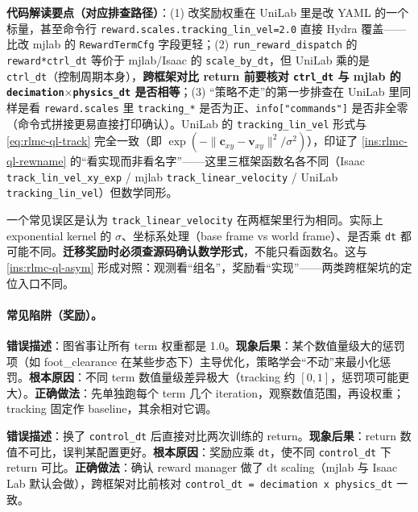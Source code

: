 \textbf{代码解读要点（对应排查路径）}：(1) 改奖励权重在 UniLab 里是改 YAML 的一个标量，甚至命令行 \verb|reward.scales.tracking_lin_vel=2.0| 直接 Hydra 覆盖——比改 mjlab 的 \verb|RewardTermCfg| 字段更轻；(2) \verb|run_reward_dispatch| 的 \verb|reward*ctrl_dt| 等价于 mjlab/Isaac 的 \verb|scale_by_dt|，但 UniLab 乘的是 \verb|ctrl_dt|（控制周期本身），\textbf{跨框架对比 return 前要核对 \texttt{ctrl\_dt} 与 mjlab 的 \texttt{decimation}$\times$\texttt{physics\_dt} 是否相等}；(3) “策略不走”的第一步排查在 UniLab 里同样是看 \verb|reward.scales| 里 \verb|tracking_*| 是否为正、\verb|info["commands"]| 是否非全零（命令式拼接更易直接打印确认）。UniLab 的 \verb|tracking_lin_vel| 形式与 \eqref{eq:rlmc-ql-track} 完全一致（即 $\exp(-\lVert\mathbf{c}_{xy}-\mathbf{v}_{xy}\rVert^2/\sigma^2)$），印证了 \cref{ins:rlmc-ql-rewname} 的“看实现而非看名字”——这里三框架函数名各不同（Isaac \verb|track_lin_vel_xy_exp| / mjlab \verb|track_linear_velocity| / UniLab \verb|tracking_lin_vel|）但数学同形。

\begin{insight}\label{ins:rlmc-ql-rewname}
一个常见误区是认为 \verb|track_linear_velocity| 在两框架里行为相同。实际上 exponential kernel 的 $\sigma$、坐标系处理（base frame vs world frame）、是否乘 \verb|dt| 都可能不同。\textbf{迁移奖励时必须查源码确认数学形式}，不能只看函数名。这与 \cref{ins:rlmc-ql-asym} 形成对照：观测看“组名”，奖励看“实现”——两类跨框架坑的定位入口不同。
\end{insight}

\paragraph{常见陷阱（奖励）。}

\begin{pitfall}[把所有奖励权重设为 1.0]
\textbf{错误描述}：图省事让所有 term 权重都是 1.0。\textbf{现象后果}：某个数值量级大的惩罚项（如 foot\_clearance 在某些步态下）主导优化，策略学会“不动”来最小化惩罚。\textbf{根本原因}：不同 term 数值量级差异极大（tracking 约 $[0,1]$，惩罚项可能更大）。\textbf{正确做法}：先单独跑每个 term 几个 iteration，观察数值范围，再设权重；tracking 固定作 baseline，其余相对它调。
\end{pitfall}

\begin{pitfall}
\textbf{错误描述}：换了 \verb|control_dt| 后直接对比两次训练的 return。\textbf{现象后果}：return 数值不可比，误判某配置更好。\textbf{根本原因}：奖励应乘 \verb|dt|，使不同 \verb|control_dt| 下 return 可比。\textbf{正确做法}：确认 reward manager 做了 dt scaling（mjlab 与 Isaac Lab 默认会做），跨框架对比前核对 \verb|control_dt = decimation x physics_dt| 一致。
\end{pitfall}

